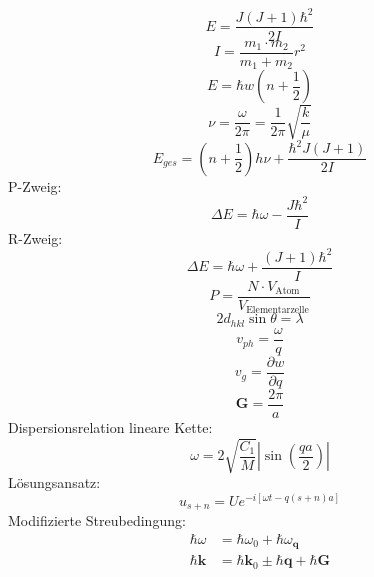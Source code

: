 \documentclass[11pt]{article}
\begin{document}
\begin{equation}
  E=\frac{J(J+1)\hbar^2}{2I}
\end{equation}
\begin{equation}
  I=\frac{m_1\cdot m_2}{m_1+m_2}{r^2}
\end{equation}
\begin{equation}
  E=\hbar w(n+\frac{1}{2})
\end{equation}
\begin{equation}
  \nu=\frac{\omega}{2\pi}=\frac{1}{2\pi}\sqrt{\frac{k}{\mu}}
\end{equation}
\begin{equation}
  E_{ges}=\left(n+\frac{1}{2}\right)h\nu+\frac{\hbar^2J(J+1)}{2I}
\end{equation}
P-Zweig:
\begin{equation}
  \Delta E = \hbar\omega-\frac{J\hbar^2}{I}
\end{equation}
R-Zweig:
\begin{equation}
  \Delta E = \hbar\omega+\frac{(J+1)\hbar^2}{I}
\end{equation}
\begin{equation}
  P=\frac{N\cdot V_{\text{Atom}}}{V_{\text{Elementarzelle}}}
\end{equation}
\begin{equation}
  2d_{hkl}\sin{\theta}=\lambda
\end{equation}
\begin{equation}
  v_{ph}=\frac{\omega}{q}
\end{equation}
\begin{equation}
  v_g=\frac{\partial w}{\partial q}
\end{equation}
\begin{equation}
  \bm{G}=\frac{2\pi}{a}
\end{equation}
Dispersionsrelation lineare Kette:
\begin{equation}
  \omega=2\sqrt{\frac{C_1}{M}}\left|\sin\left(\frac{qa}{2}\right)\right|
\end{equation}
Lösungsansatz:
\begin{equation}
  u_{s+n}=Ue^{-i[\omega t-q(s+n)a]}
\end{equation}
Modifizierte Streubedingung:
\begin{equation}
  \begin{align}
    \hbar\omega&=\hbar\omega_0+\hbar\omega_{\bm{q}}\\
    \hbar\bm{k}&=\hbar\bm{k}_0\pm\hbar\bm{q}+\hbar\bm{G}
  \end{align}
\end{equation}
\end{document}
